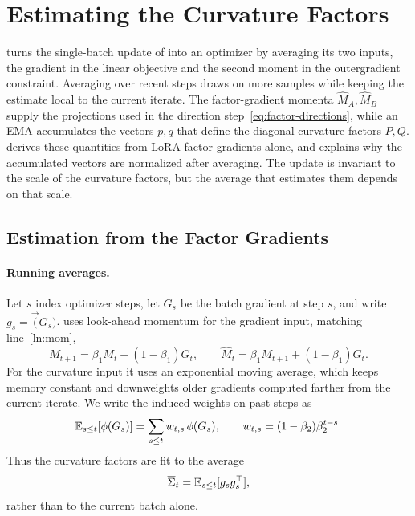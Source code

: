 
\section{Estimating the Curvature Factors}
\label{app:matnormal-02}
 turns the single-batch update of
 into an optimizer by averaging its two inputs,
the gradient in the linear objective and the second moment in the
outergradient constraint. Averaging over recent steps draws on more samples
while keeping the estimate local to the current iterate. The factor-gradient
momenta $\widehat M_A,\widehat M_B$ supply
the projections used in the direction step~\eqref{eq:factor-directions},
while an EMA accumulates the vectors $p,q$ that define the diagonal
curvature factors $P,Q$.  derives these
quantities from LoRA factor gradients alone, and
 explains why the accumulated vectors are
normalized after averaging. The update is invariant to the scale of the
curvature factors, but the average that estimates them depends on that scale.

\subsection{Estimation from the Factor Gradients}
\label{sec:weighted-estimation-02}

\paragraph{Running averages.} Let $s$ index optimizer steps, let $G_s$ be
the batch gradient at step $s$, and write $g_s=\vec(G_s)$.
 uses look-ahead momentum for the gradient input, matching
line~\ref{ln:mom},
\[
  M_{t+1}=\beta_1M_t+(1-\beta_1)G_t,
  \qquad
  \widehat M_t=\beta_1M_{t+1}+(1-\beta_1)G_t.
\]
For the curvature input it uses an exponential moving average, which keeps
memory constant and downweights older gradients computed farther from the
current iterate. We write the induced weights on past steps as
\[
  \mathbb{E}_{s \leq t}[\phi(G_s)]=\sum_{s\le t}w_{t,s}\,\phi(G_s),
  \qquad
  w_{t,s}=(1-\beta_2)\beta_2^{t-s}.
\]
Thus the curvature factors are fit to the average
\[
  \overline{\Sigma}_t=\mathbb{E}_{s\leq t}[g_sg_s^\top],
\]
rather than to the current batch alone.

